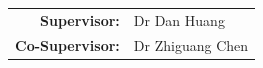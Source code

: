 \documentclass[8pt]{report}
\makeatletter
\newcommand{\supervisorA}{Dr Dan Huang}  %
\newcommand{\supervisorB}{Dr Zhiguang Chen}   %
\renewenvironment{titlepage}{%
  \cleardoublepage
  \if@twocolumn
    \@restonecoltrue\onecolumn
  \else
    \@restonecolfalse\newpage
  \fi
  \thispagestyle{empty}%
}{%
  \if@restonecol\twocolumn \else \newpage \fi
}
\makeatother
\begin{document}
\begin{titlepage}
\begin{minipage}{0.75\textwidth}
		\vspace{0.8cm}
		
		\begin{tabular}{rl}
			\textbf{Supervisor:} & \supervisorA \\
			\textbf{Co-Supervisor:} & \supervisorB
		\end{tabular}

	\end{minipage}

    \vfill
\end{titlepage}

\begin{multicols}{2}








\end{multicols}
\end{document}
